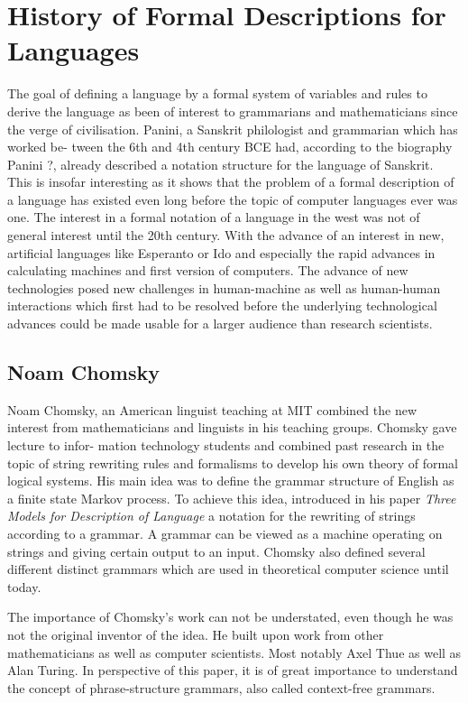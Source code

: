 \documentclass{article}
\begin{document}
\section{History of Formal Descriptions for Languages}
The goal of defining a language by a formal system of variables and rules to derive the language as been of interest to grammarians and mathematicians since the verge of civilisation. Panini, a Sanskrit philologist and grammarian which has worked be- tween the 6th and 4th century BCE had, according to the biography Panini ?, already described a notation structure for the language of Sanskrit. This is insofar interesting as it shows that the problem of a formal description of a language has existed even long before the topic of computer languages ever was one. The interest in a formal notation of a language in the west was not of general interest until the 20th century. With the advance of an interest in new, artificial languages like Esperanto or Ido and especially the rapid advances in calculating machines and first version of computers. The advance of new technologies posed new challenges in human-machine as well as human-human interactions which first had to be resolved before the underlying technological advances could be made usable for a larger audience than research scientists.

\subsection{Noam Chomsky}
Noam Chomsky, an American linguist teaching at MIT combined the new interest from mathematicians and linguists in his teaching groups. Chomsky gave lecture to infor- mation technology students and combined past research in the topic of string rewriting rules and formalisms to develop his own theory of formal logical systems. His main idea was to define the grammar structure of English as a finite state Markov process. To achieve this idea, \cite{1056813} introduced in his paper \textit{Three Models for Description of Language} a notation for the rewriting of strings according to a grammar. A grammar can be viewed as a machine operating on strings and giving certain output to an input. Chomsky also defined several different distinct grammars which are used in theoretical computer science until today.

The importance of Chomsky’s work can not be understated, even though he was not the original inventor of the idea. He built upon work from other mathematicians as well as computer scientists. Most notably Axel Thue as well as Alan Turing. In perspective of this paper, it is of great importance to understand the concept of phrase-structure grammars, also called context-free grammars.
\end{document}
